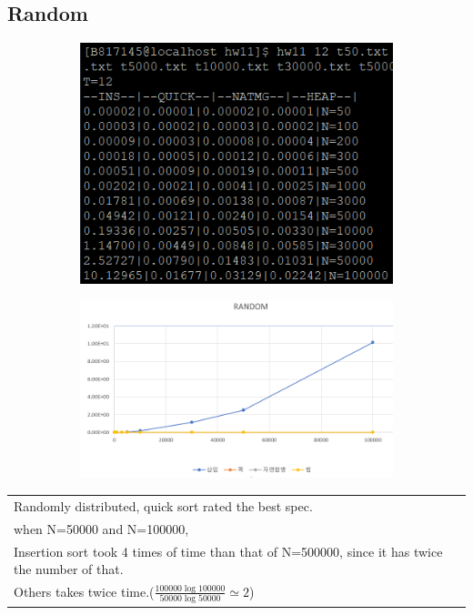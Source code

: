 \documentclass{article}
\begin{document}
\subsection{Random }
\begin{figure}[H]
\begin{subfigure}[ht]{.3\linewidth}\centering
\includegraphics[width=.9\linewidth]{random2.PNG}
\end{subfigure}
\begin{subfigure}[ht]{.7\linewidth}\centering
\includegraphics[width=.9\linewidth]{random.PNG}
\end{subfigure}
\end{figure}
\begin{table}[H]
\centering
\begin{tabular}{|m{15cm}|}
\hline
Randomly distributed, quick sort rated the best spec.\\
when N=50000 and N=100000, \\
Insertion sort took 4 times of time than that of N=500000, since it has twice the number of  that.\\
Others takes twice time.($\frac{100000\log 100000}{50000\log 50000}\simeq 2$) \\
\hline
\end{tabular}
\end{table}
\end{document}
